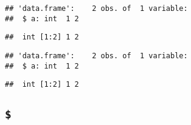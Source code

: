 \begin{itemize}
\begin{Shaded}
\begin{Highlighting}[]
\StringTok{ }\NormalTok{(} \OperatorTok{:}\NormalTok{, } \OperatorTok{:}\NormalTok{)}
\NormalTok{(df[}\NormalTok{])}
\end{Highlighting}
\end{Shaded}

\begin{verbatim}
## 'data.frame':    2 obs. of  1 variable:
##  $ a: int  1 2
\end{verbatim}

\begin{Shaded}
\begin{Highlighting}[]
\NormalTok{(df[[}\NormalTok{]])}
\end{Highlighting}
\end{Shaded}

\begin{verbatim}
##  int [1:2] 1 2
\end{verbatim}

\begin{Shaded}
\begin{Highlighting}[]
\NormalTok{(df[, }\NormalTok{, } \NormalTok{])}
\end{Highlighting}
\end{Shaded}

\begin{verbatim}
## 'data.frame':    2 obs. of  1 variable:
##  $ a: int  1 2
\end{verbatim}

\begin{Shaded}
\begin{Highlighting}[]
\NormalTok{(df[, }\NormalTok{])}
\end{Highlighting}
\end{Shaded}

\begin{verbatim}
##  int [1:2] 1 2
\end{verbatim}
\end{itemize}

\hypertarget{section}{%
\subsection{\texorpdfstring{\texttt{\$}}{\$}}\label{section}}

